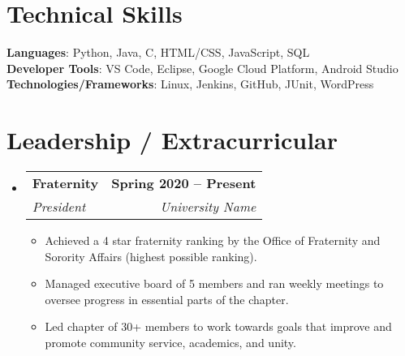 \documentclass[letterpaper,11pt]{article}
\makeatletter
\newcommand{\resumeItem}[1]{
  \item\small{
    {#1 \vspace{-2pt}}
  }
}
\newcommand{\resumeSubheading}[4]{
  \vspace{-2pt}\item
    \begin{tabular*}{1.0\textwidth}[t]{l@{\extracolsep{\fill}}r}
      \textbf{#1} & \textbf{\small #2} \\
      \textit{\small#3} & \textit{\small #4} \\
    \end{tabular*}\vspace{-7pt}
}
\newcommand{\resumeSubHeadingListStart}{\begin{itemize}[leftmargin=0.0in, label={}]}
\newcommand{\resumeSubHeadingListEnd}{\end{itemize}}
\newcommand{\resumeItemListStart}{\begin{itemize}}
\newcommand{\resumeItemListEnd}{\end{itemize}\vspace{-5pt}}
\makeatother
\begin{document}
\section{Technical Skills}
 \begin{itemize}[leftmargin=0.15in, label={}]
    \small{\item{
     \textbf{Languages}{: Python, Java, C, HTML/CSS, JavaScript, SQL} \\
     \textbf{Developer Tools}{: VS Code, Eclipse, Google Cloud Platform, Android Studio} \\
     \textbf{Technologies/Frameworks}{: Linux, Jenkins, GitHub, JUnit, WordPress} \\
    }}
 \end{itemize}
 \vspace{-16pt}


\section{Leadership / Extracurricular}
    \resumeSubHeadingListStart
        \resumeSubheading{Fraternity}{Spring 2020 -- Present}{President}{University Name}
            \resumeItemListStart
                \resumeItem{Achieved a 4 star fraternity ranking by the Office of Fraternity and Sorority Affairs (highest possible ranking).}
                \resumeItem{Managed executive board of 5 members and ran weekly meetings to oversee progress in essential parts of the chapter.}
                \resumeItem{Led chapter of 30+ members to work towards goals that improve and promote community service, academics, and unity.}
            \resumeItemListEnd
        
    \resumeSubHeadingListEnd
\end{document}
